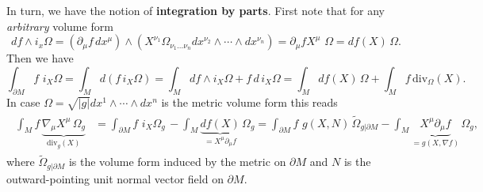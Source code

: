 \documentclass[../geometry_main.tex]{subfiles}
\begin{document}
\begin{mytheorem}
In turn, we have the notion of \textbf{integration by parts}.
First note that for any \emph{arbitrary} volume form
\begin{equation}
    df\wedge i_x \Omega = \left(\partial_\mu f \,dx^\mu\right)\wedge \left(X^{\nu_1} \Omega_{\nu_1 \dots \nu_n} dx^{\nu_2} \wedge \cdots \wedge dx^{\nu_n}\right) = \partial_\mu f X^{\mu}\,\, \Omega = df(X) \,\Omega.
\end{equation}
Then we have 
\begin{equation}
    \int_{\partial M} f\,\, i_X \Omega = \int_M d(f\, i_X \Omega) = \int_M df \wedge i_X \Omega + f\, d \,i_X\Omega = \int_M df(X) \,\Omega + \int_M f\, \mathrm{div}_\Omega (X).
\end{equation}
In case $\Omega = \sqrt{|g|} dx^1 \wedge \cdots \wedge dx^n$ is the metric volume form this reads
\begin{align}
\begin{aligned}
    \int_{M} f\, \underbrace{\nabla_\mu X^{\mu} \, \Omega_g}_{\mathrm{div}_g(X)}
    &= \int_{\partial M} f\,\, i_X\Omega_g\, - \int_M \underbrace{df(X)}_{= X^{\mu} \partial_\mu f} \, \Omega_g
    = \int_{\partial M} f\,\, g(X,N)\, \tilde{\Omega}_{g|\partial M} - \int_M \underbrace{X^{\mu} \partial_\mu f}_{=g(X,\nabla f)}\, \Omega_g,
\end{aligned}
\end{align}
where $\tilde{\Omega}_{g|\partial M}$ is the volume form induced by the metric on $\partial M$ and $N$ is the outward-pointing unit normal vector field on $\partial M$.
\end{mytheorem}
\end{document}
